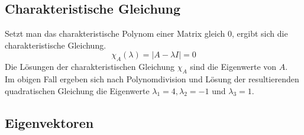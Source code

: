 \subsection{Charakteristische Gleichung}
\label{sub:charakteristische_gleichung} 

Setzt man das charakteristische Polynom einer Matrix gleich 0, ergibt sich die charakteristische Gleichung.
\begin{equation}
	\chi_A(\lambda) = |A - \lambda I| = 0
\end{equation}
Die Lösungen der charakteristischen Gleichung $\chi_A$ sind die Eigenwerte von $A$.\\
Im obigen Fall ergeben sich nach Polynomdivision und Lösung der resultierenden quadratischen
Gleichung die Eigenwerte $\lambda_1 = 4, \lambda_2 = -1$ und $\lambda_3 = 1$.
\subsection{Eigenvektoren}
\label{sub:eigenvektoren}

